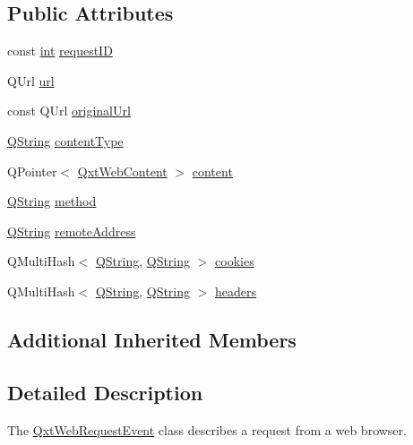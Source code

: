 \subsection*{Public Attributes}
\begin{DoxyCompactItemize}
\item 
const \hyperlink{ioapi_8h_a787fa3cf048117ba7123753c1e74fcd6}{int} \hyperlink{class_qxt_web_request_event_a79e20dd1cbc06f8cf1abe47bf6360277}{request\-I\-D}
\item 
Q\-Url \hyperlink{class_qxt_web_request_event_a7478ca98a01fddf7b22b4c0f79c9d0a8}{url}
\item 
const Q\-Url \hyperlink{class_qxt_web_request_event_a0a4ad2f21fe52a1559508b1df842f540}{original\-Url}
\item 
\hyperlink{group___u_a_v_objects_plugin_gab9d252f49c333c94a72f97ce3105a32d}{Q\-String} \hyperlink{class_qxt_web_request_event_a7be4586ea32c7e6a968f824f4618bdd7}{content\-Type}
\item 
Q\-Pointer$<$ \hyperlink{class_qxt_web_content}{Qxt\-Web\-Content} $>$ \hyperlink{class_qxt_web_request_event_ac6bc9d31ef80c6e739c0859b994bc950}{content}
\item 
\hyperlink{group___u_a_v_objects_plugin_gab9d252f49c333c94a72f97ce3105a32d}{Q\-String} \hyperlink{class_qxt_web_request_event_ae8871184cd34444c8bbc76fd58f46333}{method}
\item 
\hyperlink{group___u_a_v_objects_plugin_gab9d252f49c333c94a72f97ce3105a32d}{Q\-String} \hyperlink{class_qxt_web_request_event_a730040f4ccb8843787bd590f1de6f047}{remote\-Address}
\item 
Q\-Multi\-Hash$<$ \hyperlink{group___u_a_v_objects_plugin_gab9d252f49c333c94a72f97ce3105a32d}{Q\-String}, \hyperlink{group___u_a_v_objects_plugin_gab9d252f49c333c94a72f97ce3105a32d}{Q\-String} $>$ \hyperlink{class_qxt_web_request_event_afa70604b2da01c5d6f00d0d6b0214599}{cookies}
\item 
Q\-Multi\-Hash$<$ \hyperlink{group___u_a_v_objects_plugin_gab9d252f49c333c94a72f97ce3105a32d}{Q\-String}, \hyperlink{group___u_a_v_objects_plugin_gab9d252f49c333c94a72f97ce3105a32d}{Q\-String} $>$ \hyperlink{class_qxt_web_request_event_aa8beef38086e9b74c1bedb238d80d0fe}{headers}
\end{DoxyCompactItemize}
\subsection*{Additional Inherited Members}


\subsection{Detailed Description}
The \hyperlink{class_qxt_web_request_event}{Qxt\-Web\-Request\-Event} class describes a request from a web browser. 

